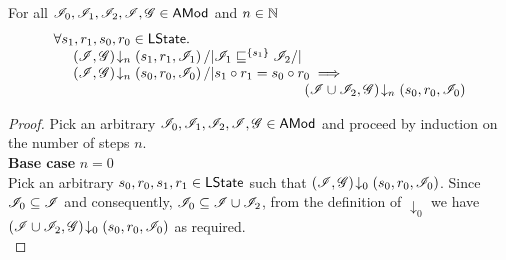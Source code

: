 \begin{lemma}\label{lem:shift-closure-2}
For all $\mathscr{I}_0, \mathscr{I}_1, \mathscr{I}_2, \mathscr{I}, \mathscr{G} \in \textsf{AMod}$ and  $n \in \mathbb{N}$
%
\[
\begin{array}{@{} l @{\hspace{-3cm}} l @{\hspace{-1cm}} l @{} } 
	\for{s_1, r_1, s_0, r_0 \in \LStates} & &\\
	& \extendsAMUpto{\lmod, \gmod}{n}{s_1}{r_1}{\lmod_1} /| \lmod_1 \weakenI{\{s_1\}} \lmod_2 /| \null & \\
	& \extendsAMUpto{\lmod, \gmod}{n}{s_0}{r_0}{\lmod_0} /| s_1 \composeL r_1 = s_0 \composeL r_0 \implies & \\
	& &\extendsAMUpto{\lmod \cup \lmod_2, \gmod}{n}{s_0}{r_0}{\lmod_0}
\end{array}
\]
%
\begin{proof}
Pick an arbitrary $\mathscr{I}_0, \mathscr{I}_1, \mathscr{I}_2, \mathscr{I}, \mathscr{G} \in \textsf{AMod}$ and proceed by induction on the number of steps $n$.\\

\noindent\textbf{Base case} $n = 0$\\
Pick an arbitrary $s_0, r_0, s_1, r_1 \in \textsf{LState}$ such that $\left(\mathscr{I}, \mathscr{G}\right) \!\downarrow_{0} \left(s_0, r_0, \mathscr{I}_0\right)$. Since $\mathscr{I}_0 \subseteq \mathscr{I}$ and consequently, $\mathscr{I}_0 \subseteq \mathscr{I} \cup \mathscr{I}_2$, from the definition of $\downarrow_0$ we have $\left(\mathscr{I} \cup \mathscr{I}_2, \mathscr{G}\right) \!\downarrow_{0} \left(s_0, r_0, \mathscr{I}_0\right)$ as required.\\


\end{proof}
\end{lemma}
